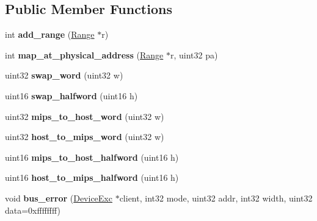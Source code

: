 \subsection*{Public Member Functions}
\begin{DoxyCompactItemize}
\item 
\hypertarget{classMapper_a8733fffed63e13e9a0584d2e3c85d0b4}{
int {\bfseries add\_\-range} (\hyperlink{classRange}{Range} $\ast$r)}
\label{classMapper_a8733fffed63e13e9a0584d2e3c85d0b4}

\item 
\hypertarget{classMapper_a1c30883b6490a8283f4dab8dfe797860}{
int {\bfseries map\_\-at\_\-physical\_\-address} (\hyperlink{classRange}{Range} $\ast$r, uint32 pa)}
\label{classMapper_a1c30883b6490a8283f4dab8dfe797860}

\item 
\hypertarget{classMapper_aad996f69d0a2aca785f5a8e9440789be}{
uint32 {\bfseries swap\_\-word} (uint32 w)}
\label{classMapper_aad996f69d0a2aca785f5a8e9440789be}

\item 
\hypertarget{classMapper_a51a9d4d84550d699fa738fccc0e227da}{
uint16 {\bfseries swap\_\-halfword} (uint16 h)}
\label{classMapper_a51a9d4d84550d699fa738fccc0e227da}

\item 
\hypertarget{classMapper_ac40b7a8813b99b8b71ac2ae9e18c07b6}{
uint32 {\bfseries mips\_\-to\_\-host\_\-word} (uint32 w)}
\label{classMapper_ac40b7a8813b99b8b71ac2ae9e18c07b6}

\item 
\hypertarget{classMapper_ab63092a89802fab46fe3c4e2191e76fd}{
uint32 {\bfseries host\_\-to\_\-mips\_\-word} (uint32 w)}
\label{classMapper_ab63092a89802fab46fe3c4e2191e76fd}

\item 
\hypertarget{classMapper_a071b247e7dc9ec05844a168dba047b85}{
uint16 {\bfseries mips\_\-to\_\-host\_\-halfword} (uint16 h)}
\label{classMapper_a071b247e7dc9ec05844a168dba047b85}

\item 
\hypertarget{classMapper_a18be0c1a96acac7cea7b32b9d46ba800}{
uint16 {\bfseries host\_\-to\_\-mips\_\-halfword} (uint16 h)}
\label{classMapper_a18be0c1a96acac7cea7b32b9d46ba800}

\item 
\hypertarget{classMapper_a79b29cfdb440f48772303d66c8f33ad1}{
void {\bfseries bus\_\-error} (\hyperlink{classDeviceExc}{DeviceExc} $\ast$client, int32 mode, uint32 addr, int32 width, uint32 data=0xffffffff)}
\label{classMapper_a79b29cfdb440f48772303d66c8f33ad1}


\end{DoxyCompactItemize}
